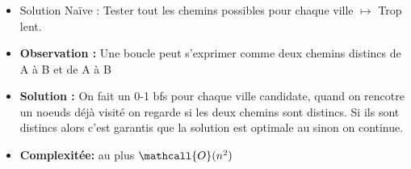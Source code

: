 \begin{frame}
    \frametitle{\problemtitle}
    \begin{itemize}
        \begin{block}{Problème}
            Un graphe avec $n$ villes et $m$ villes candidates, trouver la ville candidate dont le cycle est le plus petit.
        \end{block}
        \item<+-> Solution Naïve : Tester tout les chemins possibles pour chaque ville $\mapsto$ Trop lent.
        \item<+-> \textbf{Observation :} Une boucle peut s'exprimer comme deux chemins distincs de A à B et de A à B
        \item<+-> \textbf{Solution :} On fait un 0-1 bfs pour chaque ville candidate, quand on rencotre un noeuds déjà visité on regarde si les deux chemins sont distincs. Si ils sont distincs alors c'est garantis que la solution est optimale au sinon on continue.
        \item<+-> \textbf{Complexitée: } au plus $\mathcall{O}(n^2)$
    \end{itemize}
    \solvestats
\end{frame}
